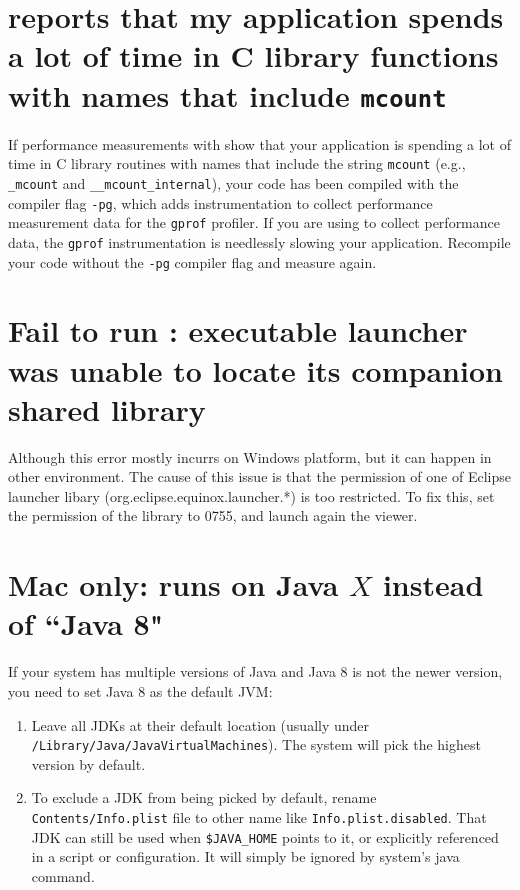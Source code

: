 \documentclass[11pt,letterpaper]{report}
\begin{document}
\section{\hpcrun{} reports that my application spends a lot of time in C library functions with names that include {\tt mcount}}

If performance measurements with \hpcrun{} show that your
application is spending a lot of time in C library routines with
names that include the string {\tt mcount} (e.g., \verb|_mcount| and
\verb|__mcount_internal|), your code has been compiled with the compiler
flag \verb|-pg|, which adds instrumentation to collect performance
measurement data for the \verb|gprof| profiler.  If you are using
\hpcrun{} to collect performance data, the \verb|gprof| instrumentation
is needlessly slowing your application. Recompile your code without the
\verb|-pg| compiler flag and measure again.


\section{Fail to run \hpcviewer{}: executable launcher was unable to locate its companion shared library}

Although this error mostly incurrs on Windows platform, but it can happen in other environment. 
The cause of this issue is that the permission of one of Eclipse launcher libary (org.eclipse.equinox.launcher.*) is too restricted. 
To fix this, set the permission of the library to 0755, and launch again the viewer.



\section{Mac only: \hpcviewer{} runs on Java $X$ instead of ``Java 8"}

If your system has multiple versions of Java and Java 8 is not the newer version, you need to set Java 8 as the default JVM:

\begin{enumerate}
\item Leave all JDKs at their default location (usually under \texttt{/Library/Java/JavaVirtualMachines}). The system will pick the highest version by default.
\item To exclude a JDK from being picked by default, rename \texttt{Contents/Info.plist} file to other name like \texttt{Info.plist.disabled}. That JDK can still be used when \texttt{\$JAVA\_HOME} points to it, or explicitly referenced in a script or configuration. It will simply be ignored by system's java command.
\end{enumerate}
\end{document}
